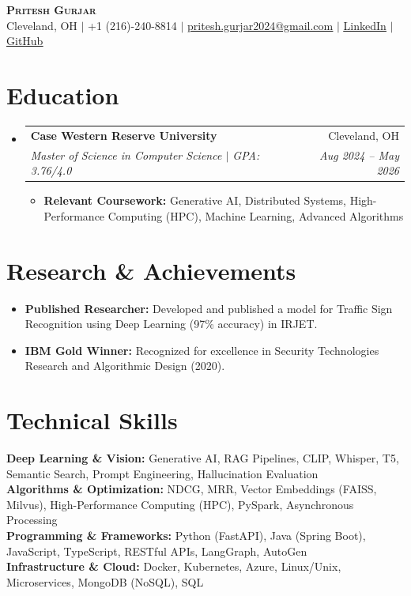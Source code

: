 \documentclass[letterpaper,10pt]{article}
\makeatletter
\newcommand{\resumeItem}[1]{
  \item\small{#1 \vspace{-4pt}}
}
\newcommand{\resumeSubheading}[4]{
  \vspace{-1pt}\item
    \begin{tabular*}{0.97\textwidth}[t]{l@{\extracolsep{\fill}}r}
      \textbf{#1} & #2 \\
      \textit{\small#3} & \textit{\small #4} \\
    \end{tabular*}\vspace{-5pt}
}
\newcommand{\resumeSubHeadingListStart}{\begin{itemize}[leftmargin=0.15in, label={}]}
\newcommand{\resumeSubHeadingListEnd}{\end{itemize}}
\newcommand{\resumeItemListStart}{\begin{itemize}}
\newcommand{\resumeItemListEnd}{\end{itemize}\vspace{-4pt}}
\makeatother
\begin{document}
\begin{center}
    \textbf{\Huge \scshape Pritesh Gurjar} \\ \vspace{1pt}
    \small Cleveland, OH $|$ +1 (216)-240-8814 $|$ \href{mailto:pritesh.gurjar2024@gmail.com}{\underline{pritesh.gurjar2024@gmail.com}} $|$ 
    \href{https://linkedin.com/in/pritesh-gurjar-aa3b87175}{\underline{LinkedIn}} $|$
    \href{https://github.com/Pritesh24gurjar}{\underline{GitHub}}
\end{center}

\section{Education}
  \resumeSubHeadingListStart
      \resumeSubheading
      {Case Western Reserve University}{Cleveland, OH}
      {Master of Science in Computer Science $|$ GPA: 3.76/4.0}{Aug 2024 -- May 2026}
      \resumeItemListStart
        \resumeItem{\textbf{Relevant Coursework:} Generative AI, Distributed Systems, High-Performance Computing (HPC), Machine Learning, Advanced Algorithms}
      \resumeItemListEnd
  \resumeSubHeadingListEnd

\section{Research \& Achievements}
  \resumeSubHeadingListStart
    \resumeItem{\textbf{Published Researcher:} Developed and published a model for Traffic Sign Recognition using Deep Learning (97\% accuracy) in IRJET.}
    \resumeItem{\textbf{IBM Gold Winner:} Recognized for excellence in Security Technologies Research and Algorithmic Design (2020).}
  \resumeSubHeadingListEnd

\section{Technical Skills}
 \begin{itemize}[leftmargin=0.15in, label={}]
    \small{\item{
     \textbf{Deep Learning \& Vision:} Generative AI, RAG Pipelines, CLIP, Whisper, T5, Semantic Search, Prompt Engineering, Hallucination Evaluation \\
     \textbf{Algorithms \& Optimization:} NDCG, MRR, Vector Embeddings (FAISS, Milvus), High-Performance Computing (HPC), PySpark, Asynchronous Processing \\
     \textbf{Programming \& Frameworks:} Python (FastAPI), Java (Spring Boot), JavaScript, TypeScript, RESTful APIs, LangGraph, AutoGen \\
     \textbf{Infrastructure \& Cloud:} Docker, Kubernetes, Azure, Linux/Unix, Microservices, MongoDB (NoSQL), SQL \\
    }}
 \end{itemize}
\end{document}
